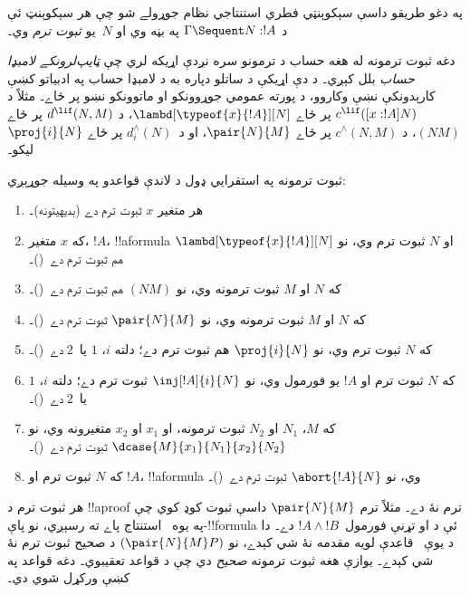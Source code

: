 \documentclass[../../../include/open-logic-section]{subfiles}
\begin{document}
په دغو طريقو داسې سېکوېنټي فطري استنتاجي نظام
جوړولے شو چې هر سېکوېنټ ئې د $\Gamma \Sequent N : !A$
په بڼه وي او $N$~يو \emph{ثبوت ترم} وي۔

دغه ثبوت ترمونه له هغه حساب د ترمونو سره نږدې
اړيکه لري چې \emph{ټايپ‌لرونکے لامبډا حساب} بلل
کېږي۔ د دې اړيکې د ساتلو دپاره به د لامبډا حساب
په ادبياتو کښې کارېدونکې نښې وکاروو، د پورته
عمومي جوړوونکو او ماتوونکو نښو پر ځاے۔ مثلاً د
$c^{\lif}([x:!A]N)$ پر ځاے $\lambd[\typeof{x}{!A}][N]$،
د $d^{\lif}(N,M)$ پر ځاے $(NM)$، د $c^\land(N,M)$
پر ځاے $\pair{N}{M}$، او د~$d^\land_i(N)$ پر ځاے
$\proj{i}{N}$ ليکو۔

\begin{defn}
  ثبوت ترمونه په استقرايي ډول د لاندې قواعدو په وسيله جوړېږي:
  \begin{enumerate}
  \item هر متغير $x$ ثبوت ترم دے (بديهيتونه)۔
  \item که $x$ متغير، $!A$، !!a{formula} او $N$ ثبوت ترم
    وي، نو $\lambd[\typeof{x}{!A}][N]$ هم ثبوت ترم دے~(\Intro\lif)۔
  \item که $N$ او $M$ ثبوت ترمونه وي، نو $(NM)$ هم ثبوت
    ترم دے~(\Elim\lif)۔
  \item که $N$ او $M$ ثبوت ترمونه وي، نو $\pair{N}{M}$
    ثبوت ترم دے~(\Intro\land)۔
  \item که $N$ ثبوت ترم وي، نو $\proj{i}{N}$ هم ثبوت
    ترم دے؛ دلته $i$، $1$ يا~$2$ دے~(\Elim\land[i])۔
  \item که $N$ ثبوت ترم او $!A$ يو فورمول وي، نو
    $\inj[!A]{i}{N}$ ثبوت ترم دے؛ دلته $i$، $1$ يا~$2$
    دے~(\Intro\lor[i])۔
  \item که $M$، $N_1$ او $N_2$ ثبوت ترمونه، او $x_1$ او
    $x_2$ متغيرونه وي، نو $\dcase{M}{x_1}{N_1}{x_2}{N_2}$
    ثبوت ترم دے~(\Elim\lor)۔
  \item که $N$ ثبوت ترم او $!A$، !!a{formula} وي، نو
    $\abort{!A}{N}$ ثبوت ترم دے~(\FalseInt)۔
  \end{enumerate}
\end{defn}

هر ثبوت ترم د !!a{proof} ترم نۀ دے۔ مثلاً ترم
$\pair{N}{M}$ داسې ثبوت کوډ کوي چې په يوه~\Intro{\land}
استنتاج پاے ته رسېږي، نو پاې-!!{formula} ئې د او
تړنې فورمول~$!A \land !B$ دے۔ دا د يوې~\Elim{\lif}
قاعدې لويه مقدمه نۀ شي کېدے، نو $(\pair{N}{M}P)$ د
صحيح ثبوت ترم نۀ شي کېدے۔ يوازې هغه ثبوت ترمونه
\emph{صحيح} دي چې د  قواعد تعقيبوي۔ دغه
قواعد په  کښې ورکړل شوي دي۔


\end{document}
